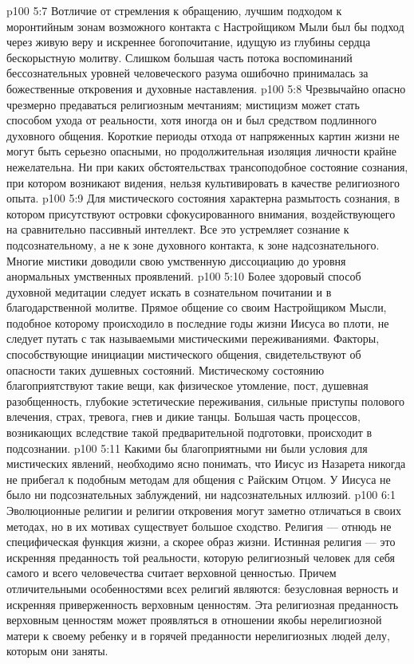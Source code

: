 \vs p100 5:7 \pc Вотличие от стремления к обращению, лучшим подходом к моронтийным зонам возможного контакта с Настройщиком Мыли был бы подход через живую веру и искреннее богопочитание, идущую из глубины сердца бескорыстную молитву. Слишком большая часть потока воспоминаний бессознательных уровней человеческого разума ошибочно принималась за божественные откровения и духовные наставления.
\vs p100 5:8 Чрезвычайно опасно чрезмерно предаваться религиозным мечтаниям; мистицизм может стать способом ухода от реальности, хотя иногда он и был средством подлинного духовного общения. Короткие периоды отхода от напряженных картин жизни не могут быть серьезно опасными, но продолжительная изоляция личности крайне нежелательна. Ни при каких обстоятельствах трансоподобное состояние сознания, при котором возникают видения, нельзя культивировать в качестве религиозного опыта.
\vs p100 5:9 Для мистического состояния характерна размытость сознания, в котором присутствуют островки сфокусированного внимания, воздействующего на сравнительно пассивный интеллект. Все это устремляет сознание к подсознательному, а не к зоне духовного контакта, к зоне надсознательного. Многие мистики доводили свою умственную диссоциацию до уровня анормальных умственных проявлений.
\vs p100 5:10 Более здоровый способ духовной медитации следует искать в сознательном почитании и в благодарственной молитве. Прямое общение со своим Настройщиком Мысли, подобное которому происходило в последние годы жизни Иисуса во плоти, не следует путать с так называемыми мистическими переживаниями. Факторы, способствующие инициации мистического общения, свидетельствуют об опасности таких душевных состояний. Мистическому состоянию благоприятствуют такие вещи, как физическое утомление, пост, душевная разобщенность, глубокие эстетические переживания, сильные приступы полового влечения, страх, тревога, гнев и дикие танцы. Большая часть процессов, возникающих вследствие такой предварительной подготовки, происходит в подсознании.
\vs p100 5:11 Какими бы благоприятными ни были условия для мистических явлений, необходимо ясно понимать, что Иисус из Назарета никогда не прибегал к подобным методам для общения с Райским Отцом. У Иисуса не было ни подсознательных заблуждений, ни надсознательных иллюзий.
\vs p100 6:1 Эволюционные религии и религии откровения могут заметно отличаться в своих методах, но в их мотивах существует большое сходство. Религия --- отнюдь не специфическая функция жизни, а скорее образ жизни. Истинная религия --- это искренняя преданность той реальности, которую религиозный человек для себя самого и всего человечества считает верховной ценностью. Причем отличительными особенностями всех религий являются: безусловная верность и искренняя приверженность верховным ценностям. Эта религиозная преданность верховным ценностям может проявляться в отношении якобы нерелигиозной матери к своему ребенку и в горячей преданности нерелигиозных людей делу, которым они заняты.
